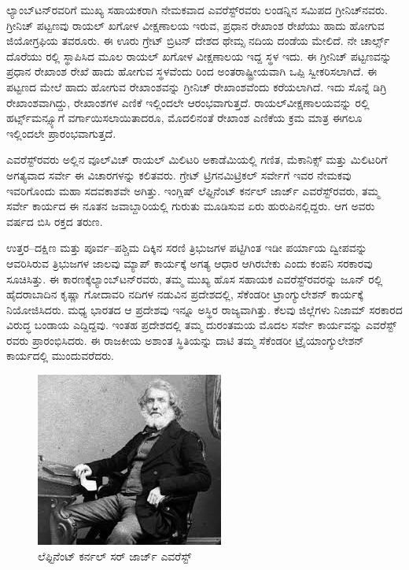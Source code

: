 ಲ್ಯಾಂಬ್​ಟನ್​ರವರಿಗೆ ಮುಖ್ಯ ಸಹಾಯಕರಾಗಿ ನೇಮಕವಾದ ಎವರೆಸ್ಟ್​ರವರು ಲಂಡನ್ನಿನ ಸಮಿಪದ ಗ್ರೀನಿಚ್​ನವರು. ಗ್ರೀನಿಚ್​ ಪಟ್ಟಣವು ರಾಯಲ್​ ಖಗೋಳ ವೀಕ್ಷಣಾಲಯ ಇರುವ, ಪ್ರಧಾನ ರೇಖಾಂಶ ರೇಖೆಯು ಹಾದು ಹೋಗುವ ಜಿಯೋಗ್ರಫಿಯ ತವರೂರು. ಈ ಊರು ಗ್ರೇಟ್​ ಬ್ರಿಟನ್​ ದೇಶದ ಥೇಮ್ಸ ನದಿಯ ದಂಡೆಯ ಮೇಲಿದೆ. ನೇ ಚಾರ್ಲ್ಸ್ ದೊರೆಯು ರಲ್ಲಿ ಸ್ಥಾಪಿಸಿದ ಮೂಲ ರಾಯಲ್​ ಖಗೋಳ ವೀಕ್ಷಣಾಲಯ ಇದ್ದ ಸ್ಥಳ ಇದು. ಈ ಗ್ರೀನಿಚ್​ ಪಟ್ಟಣವನ್ನು ಪ್ರಧಾನ ರೇಖಾಂಶ ರೇಖೆ ಹಾದು ಹೋಗುವ ಸ್ಥಳವೆಂದು  ರಿಂದ ಅಂತರಾಷ್ಟ್ರೀಯವಾಗಿ ಒಪ್ಪಿ ಸ್ವೀಕರಿಸಲಾಗಿದೆ. ಈ ಪಟ್ಟಣದ ಮೇಲೆ ಹಾದು ಹೋಗುವ ರೇಖಾಂಶವನ್ನು ಗ್ರೀನಿಚ್​ ರೇಖಾಂಶವೆಂದು ಕರೆಯಲಾಗಿದೆ. ಇದು ಸೊನ್ನೆ ಡಿಗ್ರಿ ರೇಖಾಂಶವಾಗಿದ್ದು, ರೇಖಾಂಶಗಳ ಎಣಿಕೆ ಇಲ್ಲಿಂದಲೇ ಆರಂಭವಾಗುತ್ತದೆ. ರಾಯಲ್​\break ವೀಕ್ಷಣಾಲಯವನ್ನು ರಲ್ಲಿ ಹರ್ಟ್ಸ್‌ಮನ್ಸ್ಯೂಗೆ ವರ್ಗಾಯಿಸಲಾಯಿತಾದರೂ, ಮೊದಲಿನಂತೆ ರೇಖಾಂಶ ಎಣಿಕೆಯ ಕ್ರಮ ಮಾತ್ರ ಈಗಲೂ ಇಲ್ಲಿಂದಲೇ ಪ್ರಾರಂಭವಾಗುತ್ತದೆ.

ಎವರೆಸ್ಟ್​ರವರು ಅಲ್ಲಿನ ವೂಲ್​ವಿಚ್​ ರಾಯಲ್​ ಮಿಲಿಟರಿ ಅಕಾಡೆಮಿಯಲ್ಲಿ ಗಣಿತ, ಮೆಕಾನಿಕ್ಸ್​ ಮತ್ತು ಮಿಲಿಟರಿಗೆ ಅಗತ್ಯವಾದ ಸರ್ವೇ ಈ ವಿಚಾರಗಳನ್ನು ಕಲಿತವರು. ಗ್ರೇಟ್​ ಟ್ರಿಗನಮಿಟ್ರಿಕಲ್​ ಸರ್ವೇಗೆ ಇವರ ನೇಮಕವು ಇವರಿಗೊಂದು ಮಹಾ ಸದವಕಾಶವೇ ಅಗಿತ್ತು. ಇಂಗ್ಲಿಷ್​ ಲೆಫ್ಟಿನೆಂಟ್​ ಕರ್ನಲ್​ ಜಾರ್ಜ್ ಎವರೆಸ್ಟ್​ರವರು, ತಮ್ಮ ಸರ್ವೇ ಕಾರ್ಯದ ಈ ನೂತನ ಜವಾಬ್ದಾರಿಯಲ್ಲಿ ಗುರುತು ಮೂಡಿಸುವ ಏರು ಹುರುಪಿನಲ್ಲಿದ್ದರು. ಆಗ ಅವರು  ವರ್ಷದ ಬಿಸಿ ರಕ್ತದ ತರುಣ.

ಉತ್ತರ–ದಕ್ಷಿಣ ಮತ್ತು ಪೂರ್ವ–ಪಶ್ಚಿಮ ದಿಕ್ಕಿನ ಸರಣಿ ತ್ರಿಭುಜಗಳ ಪಟ್ಟಿಗಿಂತ ಇಡೀ ಪರ್ಯಾಯ ದ್ವೀಪವನ್ನು ಆವರಿಸಿರುವ ತ್ರಿಭುಜಗಳ ಜಾಲವು ಮ್ಯಾಪ್​ ಕಾರ್ಯಕ್ಕೆ ಅಗತ್ಯ ಆಧಾರ ಆಗಿರಬೇಕು ಎಂದು ಕಂಪನಿ ಸರಕಾರವು ಸೂಚಿಸಿತ್ತು. ಈ ಕಾರಣಕ್ಕೆ\break ಲ್ಯಾಂಬ್​ಟನ್​ರವರು, ತಮ್ಮ ಮುಖ್ಯ ಹೊಸ ಸಹಾಯಕ ಎವರೆಸ್ಟ್​ರವರನ್ನು ಜೂನ್​  ರಲ್ಲಿ ಹೈದರಾಬಾದಿನ ಕೃಷ್ಣಾ ಗೋದಾವರಿ ನದಿಗಳ ನಡುವಿನ ಪ್ರದೇಶದಲ್ಲಿ, ಸೆಕೆಂಡರೀ ಟ್ರಾಂಗ್ಯುಲೇಶನ್​ ಕಾರ್ಯಕ್ಕೆ ನಿಯೋಜಿಸಿದರು. ಮಧ್ಯ ಭಾರತದ ಆ ಪ್ರದೇಶವು ಇನ್ನೂ ಅಸ್ಥಿರ ರಾಜ್ಯವಾಗಿತ್ತು. ಕೆಲವು ಜಿಲ್ಲೆಗಳು ನಿಜಾಮ್ ಸರಕಾರದ ವಿರುದ್ಧ ಬಂಡಾಯ ಎದ್ದಿದ್ದವು. ಇಂತಹ ಪ್ರದೇಶದಲ್ಲಿ ತಮ್ಮ ದುರಂತಮಯ ಮೊದಲ ಸರ್ವೇ ಕಾರ್ಯವನ್ನು ಎವರೆಸ್ಟ್​ರವರು ಪ್ರಾರಂಭಿಸಿದರು. ಈ ರಾಜಕೀಯ ಅಶಾಂತ ಸ್ಥಿತಿಯನ್ನು ದಾಟಿ ತಮ್ಮ ಸೆಕೆಂಡರೀ ಟ್ರೈಯಾಂಗ್ಯುಲೇಶನ್​ ಕಾರ್ಯದಲ್ಲಿ ಮುಂದುವರೆದರು.

\begin{figure}[!htbp]
\includegraphics{"images/image012.jpg"}
\caption{ಲೆಫ್ಟಿನೆಂಟ್​ ಕರ್ನಲ್​ ಸರ್​ ಜಾರ್ಜ್ ಎವರೆಸ್ಟ್​}\label{chap8-fig1}
\end{figure}

